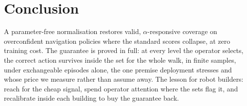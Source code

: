 \section{Conclusion}
\label{sec:conclusion}
A parameter-free normalisation restores valid, $\alpha$-responsive coverage
on overconfident navigation policies where the standard scores collapse, at
zero training cost. The guarantee is proved in full: at every level the
operator selects, the correct action survives inside the set for the whole
walk, in finite samples, under exchangeable episodes alone, the one premise
deployment stresses and whose price we measure rather than assume
away. The lesson for robot builders: reach for the cheap signal, spend
operator attention where the sets flag it, and recalibrate inside each
building to buy the guarantee back.

